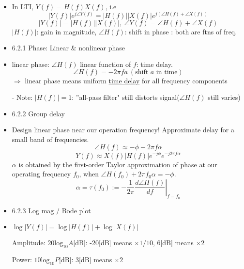 \documentclass{article}
\begin{document}
\begin{itemize}
    \item In LTI, $Y(f)=H(f)X(f)$, i.e
    \[|Y(f)|e^{j\angle Y(f)}=|H(f)||X(f)|e^{j(\angle H(f)+\angle X(f))}\]
    \[|Y(f)|=|H(f)||X(f)|,\: \angle Y(f) = \angle H(f)+\angle X(f)\]
    $|H(f)|$: gain in magnitude, $\angle H(f)$: shift in phase : both are ftns of freq.
    
    \item 6.2.1 Phase: Linear \& nonlinear phase
    \item linear phase: $\angle H(f)$ linear function of $f$: time delay.
    \[\angle H(f)=-2\pi fa\:(\text{shift } a\text{ in time})\]
    $\Rightarrow$ linear phase means uniform \underline{time delay} for all frequency components
    
    - Note: $|H(f)|=1$: ''all-pass filter" still distorts signal($\angle H(f)$ still varies)
    
    \item 6.2.2 Group delay
    \item Design linear phase near our operation frequency! Approximate delay for a small band of frequencies.
    \[\angle H(f)\approx -\phi -2\pi f\alpha\]
    \[Y(f)\approx X(f)|H(f)|e^{-j\phi}e^{-j2\pi f\alpha}\]
    $\alpha$ is obtained by the first-order Taylor approximation of phase at our operating frequency $f_0$, when $\angle H(f_0)+2\pi f_0 \alpha=-\phi$.
    \[\alpha=\tau(f_0):=-\frac{1}{2\pi}\left.\frac{d\angle H(f)}{df}\right|_{f=f_0}\]
    
    \item 6.2.3 Log mag / Bode plot
    \item $\log{|Y(f)|}=\log{|H(f)|}+\log{|X(f)|}$
    
    Amplitude: $20\mathrm{log}_{10}A$[dB]: -20[dB] means $\times1/10$, 6[dB] means $\times2$
    
    Power: $10\mathrm{log}_{10}P$[dB]: 3[dB] means $\times2$
\end{itemize}
\end{document}
